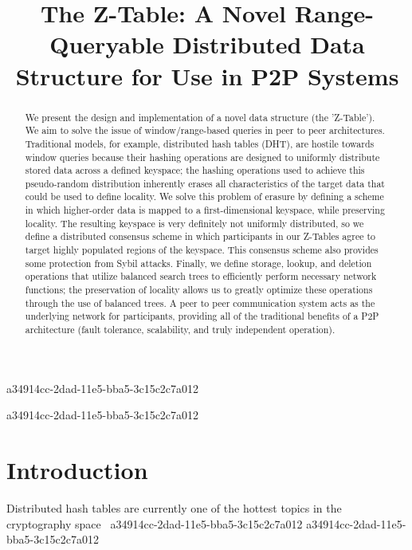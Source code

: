 \documentclass[12pt]{article}
\title{The Z-Table: A Novel Range-Queryable Distributed Data Structure for Use in P2P Systems}
\begin{document}
\maketitle

\begin{abstract}
We present the design and implementation of a novel data structure (the 'Z-Table'). We aim to solve the issue of window/range-based queries in peer to peer architectures. Traditional models, for example,  distributed hash tables (DHT), are hostile towards window queries because their hashing operations are designed to uniformly distribute stored data across a defined keyspace; the hashing operations used to achieve this pseudo-random distribution inherently erases all characteristics of the target data that could be used to define locality. We solve this problem of erasure by defining a scheme in which higher-order data is mapped to a first-dimensional keyspace, while preserving locality. The resulting keyspace is very definitely not uniformly distributed, so we define a distributed consensus scheme in which participants in our Z-Tables agree to target highly populated regions of the keyspace. This consensus scheme also provides some protection from Sybil attacks. Finally, we define storage, lookup, and deletion operations that utilize balanced search trees to efficiently perform necessary network functions; the preservation of locality allows us to greatly optimize these operations through the use of balanced trees. A peer to peer communication system acts as the underlying network for participants, providing all of the traditional benefits of a P2P architecture (fault tolerance, scalability, and truly independent operation).
\end{abstract}
a34914cc-2dad-11e5-bba5-3c15c2c7a012

\newpage
a34914cc-2dad-11e5-bba5-3c15c2c7a012\section{Introduction}
Distributed hash tables are currently one of the hottest topics in the cryptography space~\cite{Stoica:2001dj,Rowstron:2001ea,Ratnasamy:2001wn}
a34914cc-2dad-11e5-bba5-3c15c2c7a012
a34914cc-2dad-11e5-bba5-3c15c2c7a012\printbibliography
\end{document}
